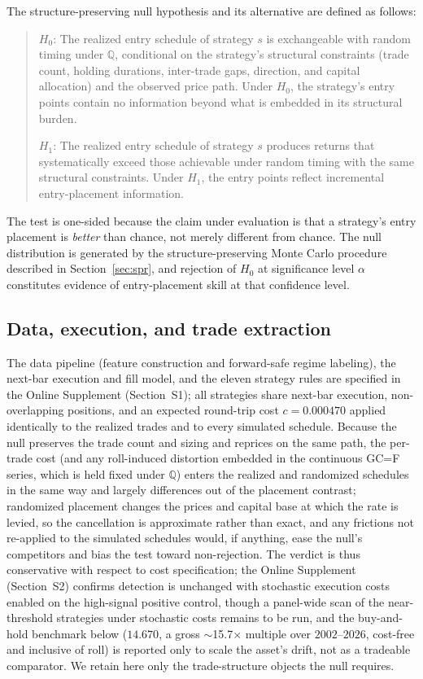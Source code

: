 \documentclass[risks,article,submit,pdftex,oneauthor]{Definitions/mdpi}
\begin{document}
The structure-preserving null hypothesis and its alternative are defined as follows:
\begin{quote}
$H_0$: The realized entry schedule of strategy $s$ is exchangeable with random timing under $\mathbb{Q}$, conditional on the strategy's structural constraints (trade count, holding durations, inter-trade gaps, direction, and capital allocation) and the observed price path. Under $H_0$, the strategy's entry points contain no information beyond what is embedded in its structural burden.

\medskip

$H_1$: The realized entry schedule of strategy $s$ produces returns that systematically exceed those achievable under random timing with the same structural constraints. Under $H_1$, the entry points reflect incremental entry-placement information.
\end{quote}

The test is one-sided because the claim under evaluation is that a strategy's entry placement is \emph{better} than chance, not merely different from chance. The null distribution is generated by the structure-preserving Monte Carlo procedure described in Section~\ref{sec:spr}, and rejection of $H_0$ at significance level $\alpha$ constitutes evidence of entry-placement skill at that confidence level.

\subsection{Data, execution, and trade extraction}

The data pipeline (feature construction and forward-safe regime labeling), the next-bar execution and fill model, and the eleven strategy rules are specified in the Online Supplement (Section~S1); all strategies share next-bar execution, non-overlapping positions, and an expected round-trip cost $c=0.000470$ applied identically to the realized trades and to every simulated schedule. Because the null preserves the trade count and sizing and reprices on the same path, the per-trade cost (and any roll-induced distortion embedded in the continuous GC=F series, which is held fixed under $\mathbb{Q}$) enters the realized and randomized schedules in the same way and largely differences out of the placement contrast; randomized placement changes the prices and capital base at which the rate is levied, so the cancellation is approximate rather than exact, and any frictions not re-applied to the simulated schedules would, if anything, ease the null's competitors and bias the test toward non-rejection. The verdict is thus conservative with respect to cost specification; the Online Supplement (Section~S2) confirms detection is unchanged with stochastic execution costs enabled on the high-signal positive control, though a panel-wide scan of the near-threshold strategies under stochastic costs remains to be run, and the buy-and-hold benchmark below ($14.670$, a gross $\sim$15.7$\times$ multiple over $2002$--$2026$, cost-free and inclusive of roll) is reported only to scale the asset's drift, not as a tradeable comparator. We retain here only the trade-structure objects the null requires.
\end{document}
